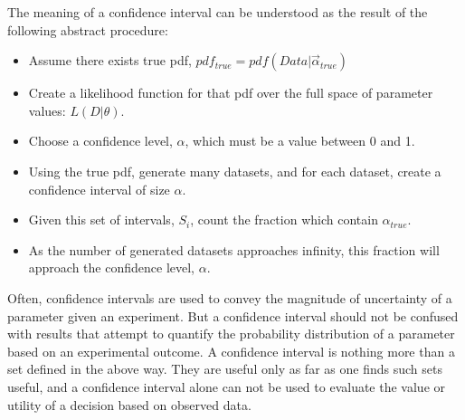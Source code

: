 The meaning of a confidence interval can be understood as the result of the following abstract procedure:
\begin{itemize}
  \item Assume there exists true pdf, $pdf_{true} = pdf(Data | \vec{\alpha}_{true})$
  \item Create a likelihood function for that pdf over the full space of parameter values: $L(D | \theta)$.
  \item Choose a confidence level, $\alpha$, which must be a value between 0 and 1.
  \item Using the true pdf, generate many datasets, and for each dataset, create a confidence interval of size $\alpha$. %
  \item Given this set of intervals, {$S_i$}, count the fraction which contain $\alpha_{true}$.
  \item As the number of generated datasets approaches infinity, this fraction will approach the confidence level, $\alpha$.
\end{itemize}

Often, confidence intervals are used to convey the magnitude of uncertainty of a parameter given an experiment.
But a confidence interval should not be confused with results that attempt to quantify the probability distribution of a parameter based on an experimental outcome.
A confidence interval is nothing more than a set defined in the above way.
They are useful only as far as one finds such sets useful, and a confidence interval alone can not be used to evaluate the value or utility of a decision based on observed data.


